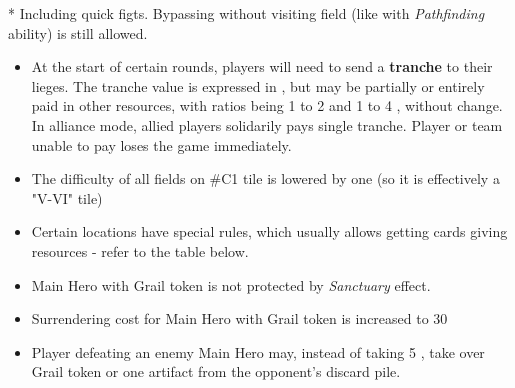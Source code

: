 \begin{multicols*}{2}
\begin{table*}[b!]
	* Including quick figts. Bypassing without visiting field (like with \textit{Pathfinding} ability) is still allowed.
\end{table*}

\begin{itemize}
	\item At the start of certain rounds, players will need to send a \textbf{tranche} to their lieges. The tranche value is expressed in , but may be partially or entirely paid in other resources, with ratios being 1  to 2  and 1  to 4 , without change. In alliance mode, allied players solidarily pays single tranche. Player or team unable to pay loses the game immediately.
	\item The difficulty of all fields on \#C1 tile is lowered by one (so it is effectively a "V-VI" tile)
	\item Certain locations have special rules, which usually allows getting cards giving resources - refer to the table below.
	\item Main Hero with Grail token is not protected by \textit{Sanctuary} effect.
	\item Surrendering cost for Main Hero with Grail token is increased to 30
	\item Player defeating an enemy Main Hero may, instead of taking 5 , take over Grail token or one artifact from the opponent's discard pile.
\end{itemize}


\end{multicols*}
